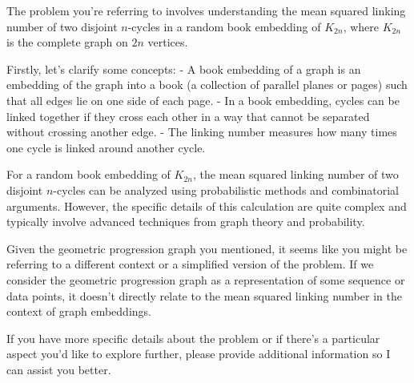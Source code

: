 The problem you're referring to involves understanding the mean squared linking number of two disjoint \( n \)-cycles in a random book embedding of \( K_{2n} \), where \( K_{2n} \) is the complete graph on \( 2n \) vertices.

Firstly, let's clarify some concepts:
- A book embedding of a graph is an embedding of the graph into a book (a collection of parallel planes or pages) such that all edges lie on one side of each page.
- In a book embedding, cycles can be linked together if they cross each other in a way that cannot be separated without crossing another edge.
- The linking number measures how many times one cycle is linked around another cycle.

For a random book embedding of \( K_{2n} \), the mean squared linking number of two disjoint \( n \)-cycles can be analyzed using probabilistic methods and combinatorial arguments. However, the specific details of this calculation are quite complex and typically involve advanced techniques from graph theory and probability.

Given the geometric progression graph you mentioned, it seems like you might be referring to a different context or a simplified version of the problem. If we consider the geometric progression graph as a representation of some sequence or data points, it doesn't directly relate to the mean squared linking number in the context of graph embeddings.

If you have more specific details about the problem or if there's a particular aspect you'd like to explore further, please provide additional information so I can assist you better.